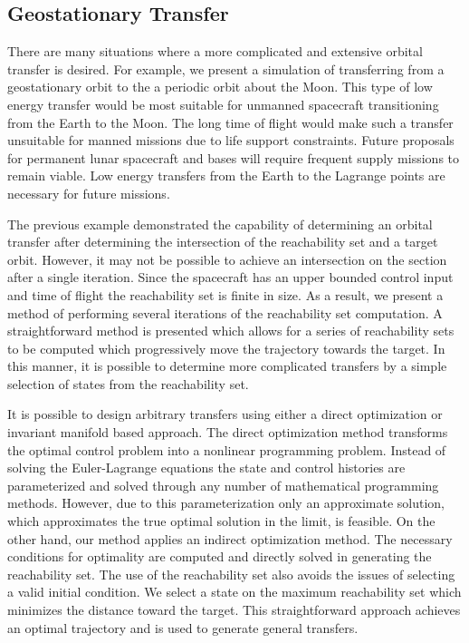 \documentclass[preprint]{elsarticle}
\begin{document}
\subsection{Geostationary Transfer}\label{sec:geo_transfer}

There are many situations where a more complicated and extensive orbital transfer is desired. 
For example, we present a simulation of transferring from a geostationary orbit to the a periodic orbit about the Moon.
This type of low energy transfer would be most suitable for unmanned spacecraft transitioning from the Earth to the Moon.
The long time of flight would make such a transfer unsuitable for manned missions due to life support constraints.
Future proposals for permanent lunar spacecraft and bases will require frequent supply missions to remain viable. 
Low energy transfers from the Earth to the Lagrange points are necessary for future missions.

The previous example demonstrated the capability of determining an orbital transfer after determining the intersection of the reachability set and a target orbit.
However, it may not be possible to achieve an intersection on the \Poincare section after a single iteration. 
Since the spacecraft has an upper bounded control input and time of flight the reachability set is finite in size. 
As a result, we present a method of performing several iterations of the reachability set computation. 
A straightforward method is presented which allows for a series of reachability sets to be computed which progressively move the trajectory towards the target.
In this manner, it is possible to determine more complicated transfers by a simple selection of states from the reachability set.

It is possible to design arbitrary transfers using either a direct optimization or invariant manifold based approach.
The direct optimization method transforms the optimal control problem into a nonlinear programming problem.
Instead of solving the Euler-Lagrange equations the state and control histories are parameterized and solved through any number of mathematical programming methods.
However, due to this parameterization only an approximate solution, which approximates the true optimal solution in the limit, is feasible. 
On the other hand, our method applies an indirect optimization method.
The necessary conditions for optimality are computed and directly solved in generating the reachability set. 
The use of the reachability set also avoids the issues of selecting a valid initial condition.
We select a state on the maximum reachability set which minimizes the distance toward the target. 
This straightforward approach achieves an optimal trajectory and is used to generate general transfers.
\end{document}
